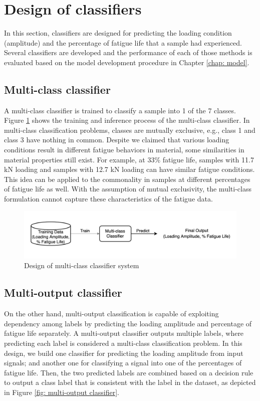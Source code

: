 \section{Design of classifiers}
\label{sec: design of classifiers}
In this section, classifiers are designed for predicting the loading condition (amplitude) and the percentage of fatigue life that a sample had experienced. Several classifiers are developed and the performance of each of those methods is evaluated based on the model development procedure in Chapter \ref{chap: model}.

\subsection{Multi-class classifier}
A multi-class classifier is trained to classify a sample into 1 of the 7 classes. Figure \ref{fig: multi-class classifier} shows the training and inference process of the multi-class classifier. In multi-class classification problems, classes are mutually exclusive, e.g., class 1 and class 3 have nothing in common. Despite we claimed that various loading conditions result in different fatigue behaviors in material, some similarities in material properties still exist. For example, at 33\% fatigue life, samples with 11.7 kN loading and samples with 12.7 kN loading can have similar fatigue conditions. This idea can be applied to the commonality in samples at different percentages of fatigue life as well. With the assumption of mutual exclusivity, the multi-class formulation cannot capture these characteristics of the fatigue data.

\begin{figure}[tb]
    \centering
    \includegraphics[width=0.9\linewidth]{fig/multi-class_classifier.png}
    \caption{Design of multi-class classifier system}
    \label{fig: multi-class classifier}
\end{figure}

\subsection{Multi-output classifier}
\label{subsec: multi-output classifier}
On the other hand, multi-output classification is capable of exploiting dependency among labels \cite{multi-label-Zhang2014} by predicting the loading amplitude and percentage of fatigue life separately. A multi-output classifier outputs multiple labels, where predicting each label is considered a multi-class classification problem. In this design, we build one classifier for predicting the loading amplitude from input signals; and another one for classifying a signal into one of the percentages of fatigue life. Then, the two predicted labels are combined based on a decision rule to output a class label that is consistent with the label in the dataset, as depicted in Figure \ref{fig: multi-output classifier}. 

